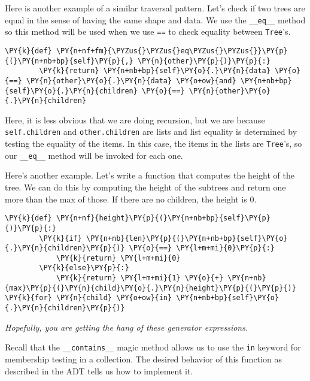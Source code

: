 Here is another example of a similar traversal pattern.
Let's check if two trees are equal in the sense of having the same shape and data.  We use the \texttt{\_\_eq\_\_} method so this method will be used when we use \texttt{==} to check equality between \texttt{Tree}'s.

\begin{Verbatim}[commandchars=\\\{\}]
    \PY{k}{def} \PY{n+nf+fm}{\PYZus{}\PYZus{}eq\PYZus{}\PYZus{}}\PY{p}{(}\PY{n+nb+bp}{self}\PY{p}{,} \PY{n}{other}\PY{p}{)}\PY{p}{:}
        \PY{k}{return} \PY{n+nb+bp}{self}\PY{o}{.}\PY{n}{data} \PY{o}{==} \PY{n}{other}\PY{o}{.}\PY{n}{data} \PY{o+ow}{and} \PY{n+nb+bp}{self}\PY{o}{.}\PY{n}{children} \PY{o}{==} \PY{n}{other}\PY{o}{.}\PY{n}{children}
\end{Verbatim}



Here, it is less obvious that we are doing recursion, but we are because \texttt{self.children} and \texttt{other.children} are lists and list equality is determined by testing the equality of the items.  In this case, the items in the  lists are \texttt{Tree}'s, so our \texttt{\_\_eq\_\_} method will be invoked for each one.


Here's another example.  Let's write a function that computes the height of the tree.  We can do this by computing the height of the subtrees and return one more than the max of those.  If there are no children, the height is $0$.

\begin{Verbatim}[commandchars=\\\{\}]
    \PY{k}{def} \PY{n+nf}{height}\PY{p}{(}\PY{n+nb+bp}{self}\PY{p}{)}\PY{p}{:}
        \PY{k}{if} \PY{n+nb}{len}\PY{p}{(}\PY{n+nb+bp}{self}\PY{o}{.}\PY{n}{children}\PY{p}{)} \PY{o}{==} \PY{l+m+mi}{0}\PY{p}{:}
            \PY{k}{return} \PY{l+m+mi}{0}
        \PY{k}{else}\PY{p}{:}
            \PY{k}{return} \PY{l+m+mi}{1} \PY{o}{+} \PY{n+nb}{max}\PY{p}{(}\PY{n}{child}\PY{o}{.}\PY{n}{height}\PY{p}{(}\PY{p}{)} \PY{k}{for} \PY{n}{child} \PY{o+ow}{in} \PY{n+nb+bp}{self}\PY{o}{.}\PY{n}{children}\PY{p}{)}
\end{Verbatim}



\emph{Hopefully, you are getting the hang of these generator expressions.}


Recall that the \texttt{\_\_contains\_\_} magic method allows us to use the \texttt{in} keyword for membership testing in a collection.
The desired behavior of this function as described in the ADT tells us how to implement it.

